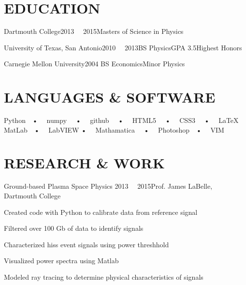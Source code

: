\documentclass[12pt,a4paper]{resume}
\begin{document}

\makecvtitle

\section{EDUCATION}

\begin{school}{Dartmouth College}{2013 \textemdash \ \ 2015}{Masters of Science in Physics}{}{}{}
\end{school}

\begin{school}{University of Texas, San Antonio}{2010 \textemdash  \ \ 2013}{BS Physics}{GPA 3.5}{Highest Honors}{}
\end{school}

\begin{school}{Carnegie Mellon University}{2004 }{BS Economics}{}{Minor Physics}{}
\end{school}

\vspace*{-0.9em}

\section{LANGUAGES \& SOFTWARE}
\WorkFont \small Python\ \ • \ \ numpy  \ \ • \ \ github \ \ • \ \   HTML5 \ \ • \ \ CSS3 \ \ • \ \ \LaTeX \ \ %
\\ MatLab\ \ • \ \ LabVIEW  • \ \ Mathamatica   \ \ • \ \  Photoshop\ \ • \ \ VIM

\section{RESEARCH \& WORK}

\begin{work}{Ground-based Plasma Space Physics }{2013  \textemdash \ \ 2015}{Prof. James LaBelle, Dartmouth College }
\item{Created code with Python to calibrate data from reference signal}
\item{Filtered over 100 Gb of data to identify signals}
\item{Characterized hiss event signals using power threshhold}
\item{Visualized power spectra using Matlab}
\item{Modeled ray tracing to determine physical characteristics of signals}
\end{work}
\end{document}
